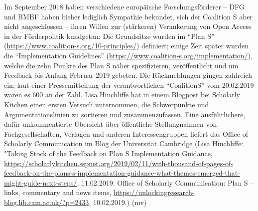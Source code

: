 \documentclass[a4paper,
fontsize=11pt,
oneside,
numbers=noperiodatend,
parskip=half-,
bibliography=totoc,
final
]{scrartcl}
\begin{document}
Im September 2018 haben verschiedene europäische Forschungsförderer --
DFG und BMBF haben bisher lediglich Sympathie bekundet, sich der
Coalition S aber nicht angeschlossen -- ihren Willen zur (stärkeren)
Verankerung von Open Access in der Förderpolitik kundgetan: Die
Grundsätze wurden im \enquote{Plan S}
(\url{https://www.coalition-s.org/10-principles/}) definiert; einige
Zeit später wurden die \enquote{Implementation Guidelines}
(\url{https://www.coalition-s.org/implementation/}), welche die zehn
Punkte des Plan S näher spezifizieren, veröffentlicht und um Feedback
bis Anfang Februar 2019 gebeten. Die Rückmeldungen gingen zahlreich ein;
laut einer Pressemitteilung der verantwortlichen \enquote{CoalitionS}
vom 20.02.2019 waren es 600 an der Zahl. Lisa Hinchliffe hat in einem
Blogpost bei Scholarly Kitchen einen ersten Versuch unternommen, die
Schwerpunkte und Argumentationslinien zu sortieren und zusammenzufassen.
Eine ausführlichere, dafür unkommentierte Übersicht über öffentliche
Stellungnahmen von Fachgesellschaften, Verlagen und anderen
Interessengruppen liefert das Office of Scholarly Communication im Blog
der Universität Cambridge (Lisa Hinchliffe: "Taking Stock of the
Feedback on Plan S Implementation Guidance,
\url{https://scholarlykitchen.sspnet.org/2019/02/11/with-thousand-of-pages-of-feedback-on-the-plans-s-implementation-guidance-what-themes-emerged-that-might-guide-next-steps/},
11.02.2019. Office of Scholarly Communication: Plan S -- links,
commentary and news items,
\url{https://unlockingresearch-blog.lib.cam.ac.uk/?p=2433}, 10.02.2019.)
(mv)

\end{document}
